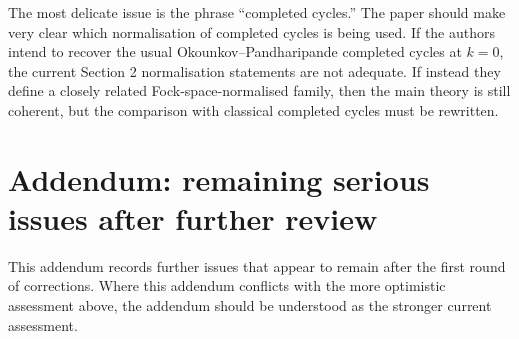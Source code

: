 \documentclass[11pt]{article}
\begin{document}
The most delicate issue is the phrase ``completed cycles.''  The paper should make very clear which normalisation of completed cycles is being used.  If the authors intend to recover the usual Okounkov--Pandharipande completed cycles at $k=0$, the current Section 2 normalisation statements are not adequate.  If instead they define a closely related Fock-space-normalised family, then the main theory is still coherent, but the comparison with classical completed cycles must be rewritten.

\section{Addendum: remaining serious issues after further review}\label{sec:addendum-remaining}

This addendum records further issues that appear to remain after the first round of corrections.  Where this addendum conflicts with the more optimistic assessment above, the addendum should be understood as the stronger current assessment.
\end{document}
